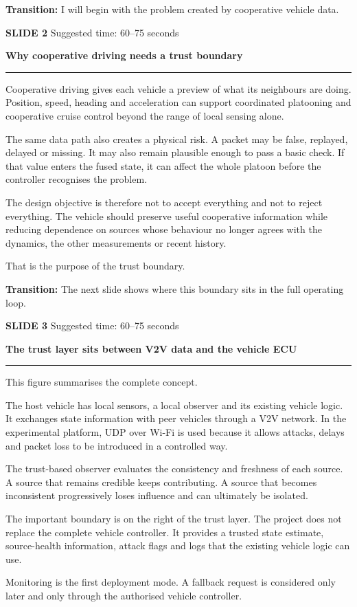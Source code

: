 \documentclass[11pt,a4paper]{article}
\newcommand{\slidetitle}[3]{%
  \clearpage
  {\color{BrandCyan}\large\bfseries SLIDE #1}\hfill
  {\color{Muted}\small Suggested time: #3}\par
  \vspace{0.18cm}
  {\color{BrandBlue}\LARGE\bfseries #2}\par
  \vspace{0.20cm}
  {\color{BrandMagenta}\rule{1.1cm}{1.2pt}}\par
  \vspace{0.12cm}
}
\newcommand{\transition}[1]{%
  \vfill
  \colorbox{Panel}{%
    \parbox{\dimexpr\textwidth-2\fboxsep\relax}{%
      \raggedright\textbf{Transition:} #1}}
}
\begin{document}
\transition{I will begin with the problem created by cooperative vehicle data.}

\slidetitle{2}{Why cooperative driving needs a trust boundary}{60--75 seconds}

Cooperative driving gives each vehicle a preview of what its neighbours are doing. Position, speed, heading and acceleration can support coordinated platooning and cooperative cruise control beyond the range of local sensing alone.

The same data path also creates a physical risk. A packet may be false, replayed, delayed or missing. It may also remain plausible enough to pass a basic check. If that value enters the fused state, it can affect the whole platoon before the controller recognises the problem.

The design objective is therefore not to accept everything and not to reject everything. The vehicle should preserve useful cooperative information while reducing dependence on sources whose behaviour no longer agrees with the dynamics, the other measurements or recent history.

That is the purpose of the trust boundary.

\transition{The next slide shows where this boundary sits in the full operating loop.}

\slidetitle{3}{The trust layer sits between V2V data and the vehicle ECU}{60--75 seconds}

This figure summarises the complete concept.

The host vehicle has local sensors, a local observer and its existing vehicle logic. It exchanges state information with peer vehicles through a V2V network. In the experimental platform, UDP over Wi-Fi is used because it allows attacks, delays and packet loss to be introduced in a controlled way.

The trust-based observer evaluates the consistency and freshness of each source. A source that remains credible keeps contributing. A source that becomes inconsistent progressively loses influence and can ultimately be isolated.

The important boundary is on the right of the trust layer. The project does not replace the complete vehicle controller. It provides a trusted state estimate, source-health information, attack flags and logs that the existing vehicle logic can use.

Monitoring is the first deployment mode. A fallback request is considered only later and only through the authorised vehicle controller.
\end{document}
